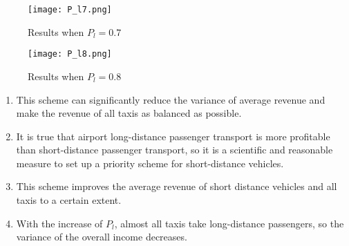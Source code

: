 \begin{figure}[h]
\centering
\texttt{[image: P\_l7.png]}
\caption{Results when $P_{l} = 0.7$}
\label{P_l7}
\end{figure}

\begin{figure}[h]
\centering
\texttt{[image: P\_l8.png]}
\caption{Results when $P_{l} = 0.8$}
\label{P_l8}
\end{figure}

\begin{enumerate}

\item 
This scheme can significantly reduce the variance of average revenue and make the revenue of all taxis as balanced as possible.
\item 
It is true that airport long-distance passenger transport is more profitable than short-distance passenger transport, so it is a scientific and reasonable measure to set up a priority scheme for short-distance vehicles.
\item
This scheme improves the average revenue of short distance vehicles and all taxis to a certain extent.
\item
With the increase of $P_{l}$, almost all taxis take long-distance passengers, so the variance of the overall income decreases.
\end{enumerate}
%
%
%
%
